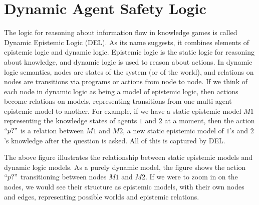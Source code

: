 \chapter{Dynamic Agent Safety Logic}
	\label{CH_03}


The logic for reasoning about information flow in knowledge games is called Dynamic Epistemic Logic (DEL). As its name suggests, it combines elements of epistemic logic and dynamic logic. Epistemic logic is the static logic for reasoning about knowledge, and dynamic logic is used to reason about actions. In dynamic logic semantics, nodes are states of the system (or of the world), and relations on nodes are transitions via programs or actions from node to node. If we think of each node in dynamic logic as being a model of epistemic logic, then actions become relations on models, representing transitions from one multi-agent epistemic model to another. For example, if we have a static epistemic model $M1$ representing the knowledge states of agents $1$ and $2$ at a moment, then the action $``p?"$ is a relation between $M1$ and $M2$, a new static epistemic model of $1$'s and $2$'s knowledge after the question is asked. All of this is captured by DEL.

\begin {center}
\end{center}

The above figure illustrates the relationship between static epistemic models and dynamic logic models. As a purely dynamic model, the figure shows the action $``p?"$ transitioning between nodes $M1$ and $M2$. If we were to zoom in on the nodes, we would see their structure as epistemic models, with their own nodes and edges, representing possible worlds and epistemic relations.

